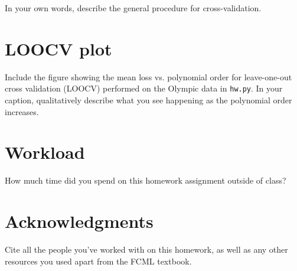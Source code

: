 \documentclass[11pt]{article}
\begin{document}
In your own words, describe the general procedure for cross-validation.

\section{LOOCV plot}

Include the figure showing the mean loss vs. polynomial order for leave-one-out
cross validation (LOOCV) performed on the Olympic data in \texttt{hw.py}. In your caption,
qualitatively describe what you see happening as the polynomial order
increases.


\section{Workload}

How much time did you spend on this homework assignment outside of class?

\section*{Acknowledgments}

Cite all the people you've worked with on this homework, as well as any other
resources you used apart from the FCML textbook.
\end{document}
